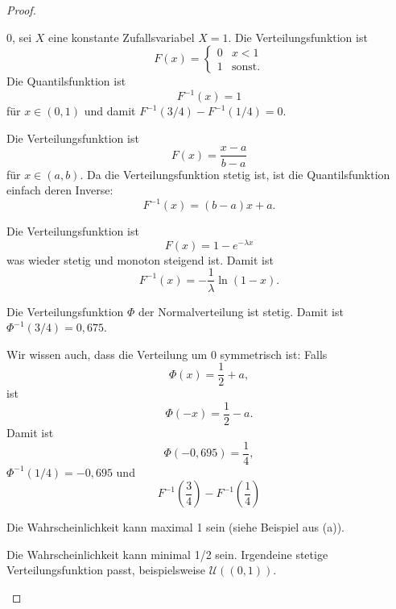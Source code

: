 	\begin{proof}
		\begin{parts}
			\item $0$, sei $X$ eine konstante Zufallsvariabel $X=1$. Die Verteilungsfunktion ist
			\[F(x)= \begin{cases}
				0 & x < 1\\
				1 & \text{sonst.}
			\end{cases}\]
			Die Quantilsfunktion ist
			\[F^{-1}(x) = 1\]
			f\"{u}r $x\in (0,1)$ und damit $F^{-1}(3/4) - F^{-1}(1/4)=0$.
			\item Die Verteilungsfunktion ist
			\[F(x) = \frac{x-a}{b-a}\]
			f\"{u}r $x\in (a,b)$. Da die Verteilungsfunktion stetig ist, ist die Quantilsfunktion einfach deren Inverse:
			\[F^{-1}(x)= (b-a)x +a.\]
			\item Die Verteilungsfunktion ist
			\[F(x)=1-e^{-\lambda x}\]
			was wieder stetig und monoton steigend ist. Damit ist
			\[F^{-1}(x) =-\frac{1}{\lambda}\ln (1-x).\]
			\item Die Verteilungsfunktion $\Phi$ der Normalverteilung ist stetig. Damit ist $\Phi^{-1}(3/4)=0,675$. 
			
			Wir wissen auch, dass die Verteilung um $0$ symmetrisch ist: Falls
			\[\Phi(x) = \frac 12 + a,\]
			ist
			\[\Phi(-x) = \frac 12 - a.\]
			Damit ist
			\[\Phi(-0,695)=\frac 14,\]
			$\Phi^{-1}(1/4)=-0,695$ und
			\[F^{-1}\left(\frac 34\right)-F^{-1}\left(\frac 14\right)\]
			\item Die Wahrscheinlichkeit kann maximal 1 sein (siehe Beispiel aus (a)).
			
			Die Wahrscheinlichkeit kann minimal 1/2 sein. Irgendeine stetige Verteilungsfunktion passt, beispielsweise $\mathcal{U}((0,1))$.
			\item  
		\end{parts}
	\end{proof}